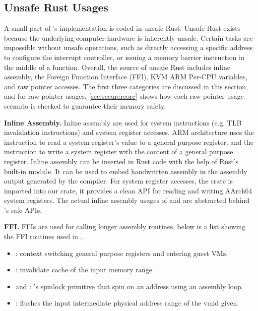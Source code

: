 \subsection{Unsafe Rust Usages}

A small part of \rustcore{}'s implementation is coded in unsafe Rust.
Unsafe Rust exists because the underlying computer hardware is inherently
unsafe. Certain tasks are impossible without unsafe operations, such as
directly accessing a specific address to configure the interrupt controller, or
issuing a memory barrier instruction in the middle of a function. Overall,
the source of unsafe Rust includes inline assembly, the Foreign Function
Interface (FFI), KVM ARM Per-CPU variables, and raw pointer accesses.
The first three categories are discussed in this section,
and for raw pointer usages, \autoref{sec:securercore} shows how each raw
pointer usage scenario is checked to guarantee their memory safety.

\textbf{Inline Assembly.}
Inline assembly are used for system instructions (e.g. TLB invalidation
instructions) and system register accesses.
ARM architecture uses the  instruction to read a system
register's value to a general purpose register, and the  instruction
to write a system register with the content of a general purpose register.
Inline assembly can be inserted in Rust code with the help of Rust's built-in
 module. It can be used to embed handwritten assembly in
the assembly output generated by the compiler.
For system register accesses, the  crate
\cite{aarch64cpu} is imported into our \rustcore{} crate, it provides a clean
API for reading and writing AArch64 system registers. The actual inline
assembly usages of  and  are abstracted behind
's safe APIs.

\textbf{FFI.}
FFIs are used for calling longer assembly routines, below is a list showing the FFI routines used in \rustcore{}.
\begin{itemize}
\item {}: context switching general purpose registers and entering guest VMs.
\item {}: invalidate cache of the input memory range.
\item {} and : \rustcore{}'s spinlock primitive that spin on an address using an assembly loop.
\item {}: flushes the input intermediate physical address range of the vmid given.
\end{itemize}

